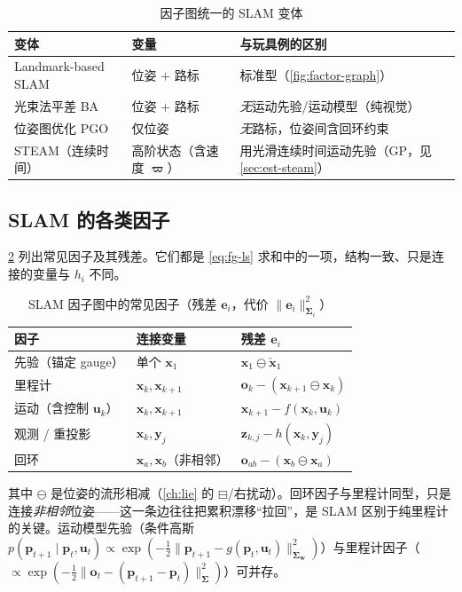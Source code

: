 \begin{table}[H]\centering\small
\caption{因子图统一的 SLAM 变体}
\label{tab:est-slam-variants}
\begin{tabular}{lll}
\toprule
变体 & 变量 & 与玩具例的区别 \\
\midrule
Landmark-based SLAM & 位姿 $+$ 路标 & 标准型（\cref{fig:factor-graph}） \\
光束法平差 BA & 位姿 $+$ 路标 & \emph{无}运动先验/运动模型（纯视觉） \\
位姿图优化 PGO & 仅位姿 & \emph{无}路标，位姿间含回环约束 \\
STEAM（连续时间） & 高阶状态（含速度 $\boldsymbol{\varpi}$） & 用光滑连续时间运动先验（GP，见 \cref{sec:est-steam}） \\
\bottomrule
\end{tabular}
\end{table}

\subsection{SLAM 的各类因子}
\label{sec:est-factors}

\cref{tab:factors} 列出常见因子及其残差。它们都是 \cref{eq:fg-ls} 求和中的一项，结构一致、只是连接的变量与 $h_i$ 不同。

\begin{table}[H]\centering\small
\caption{SLAM 因子图中的常见因子（残差 $\mathbf{e}_i$，代价 $\|\mathbf{e}_i\|_{\boldsymbol{\Sigma}_i}^2$）}
\label{tab:factors}
\begin{tabular}{lll}
\toprule
因子 & 连接变量 & 残差 $\mathbf{e}_i$ \\
\midrule
先验（锚定 gauge） & 单个 $\mathbf{x}_1$ & $\mathbf{x}_1\ominus\check{\mathbf{x}}_1$ \\
里程计 & $\mathbf{x}_k,\mathbf{x}_{k+1}$ & $\mathbf{o}_k-(\mathbf{x}_{k+1}\ominus\mathbf{x}_k)$ \\
运动（含控制 $\mathbf{u}_k$） & $\mathbf{x}_k,\mathbf{x}_{k+1}$ & $\mathbf{x}_{k+1}-f(\mathbf{x}_k,\mathbf{u}_k)$ \\
观测 / 重投影 & $\mathbf{x}_k,\mathbf{y}_j$ & $\mathbf{z}_{k,j}-h(\mathbf{x}_k,\mathbf{y}_j)$ \\
回环 & $\mathbf{x}_a,\mathbf{x}_b$（非相邻） & $\mathbf{o}_{ab}-(\mathbf{x}_b\ominus\mathbf{x}_a)$ \\
\bottomrule
\end{tabular}
\end{table}

\noindent 其中 $\ominus$ 是位姿的流形相减（\cref{ch:lie} 的 $\boxminus$/右扰动）。回环因子与里程计同型，只是连接\emph{非相邻}位姿——这一条边往往把累积漂移“拉回”，是 SLAM 区别于纯里程计的关键。运动模型先验（条件高斯 $p(\mathbf{p}_{t+1}\mid\mathbf{p}_t,\mathbf{u}_t)\propto\exp(-\tfrac12\|\mathbf{p}_{t+1}-g(\mathbf{p}_t,\mathbf{u}_t)\|_{\boldsymbol{\Sigma}_{\mathbf{w}}}^2)$）与里程计因子（$\propto\exp(-\tfrac12\|\mathbf{o}_t-(\mathbf{p}_{t+1}-\mathbf{p}_t)\|_{\boldsymbol{\Sigma}}^2)$）可并存\cite{carlone2026handbook}。


